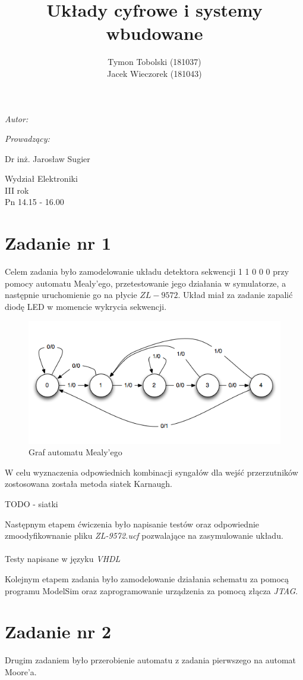 \documentclass[wide,a4paper,titlepage,12pt] {article}
\title{Układy cyfrowe i systemy wbudowane}
\author{Tymon Tobolski (181037)\\ Jacek Wieczorek (181043)}
\makeatletter
\renewcommand{\maketitle}{
\begin{titlepage}
  \begin{center}
    \vspace*{3cm}
    \LARGE \@title \par
    \vspace{2cm}
    \textit{\small Autor:}\par
    \normalsize \@author\par \normalsize
    \vspace{3cm}
    \textit{\small Prowadzący:}\par
    Dr inż. Jarosław Sugier \par
    \vspace{2cm}
    Wydział Elektroniki\\ III rok\\ Pn 14.15 - 16.00\par
    \vspace{4cm}
    \small \@date
  \end{center}
\end{titlepage}
}
\makeatother
\begin{document}
\maketitle
  \section{Zadanie nr 1}
  Celem zadania było zamodelowanie układu detektora sekwencji 1 1 0 0 0 przy pomocy automatu Mealy'ego, przetestowanie jego działania w symulatorze, a następnie uruchomienie go na płycie $ZL-9572$. Układ miał za zadanie zapalić diodę LED w momencie wykrycia sekwencji.

  \begin{figure}[htbp]
    \begin{center}
      \includegraphics[scale=0.7]{mealy-graf.png}
      \caption{Graf automatu Mealy'ego}
     \end{center}
  \end{figure}


  W celu wyznaczenia odpowiednich kombinacji syngałów dla wejść przerzutników zostosowana została metoda siatek Karnaugh.


  TODO - siatki

Następnym etapem ćwiczenia było napisanie testów oraz odpowiednie zmoodyfikownanie pliku \textit{ZL-9572.ucf} pozwalające na zasymulowanie układu.

  \newpage
  \paragraph{}
  Testy napisane w języku \textit{VHDL}
  

  Kolejnym etapem zadania było zamodelowanie działania schematu za pomocą programu ModelSim oraz zaprogramowanie urządzenia za pomocą złącza \textit{JTAG}.


  \section{Zadanie nr 2}
  Drugim zadaniem było przerobienie automatu z zadania pierwszego na automat Moore'a.
\end{document}
